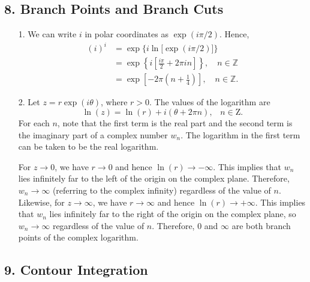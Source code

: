 \documentclass[10pt,a4paper]{article}
\begin{document}
\subsection*{8. Branch Points and Branch Cuts}

\begin{enumerate}
\item[1.]
We can write $i$ in polar coordinates as $\exp(i\pi/2).$ Hence,
\begin{align}
  (i)^i &= \exp\Big\{i \ln\big[\exp(i\pi/2)\big]\Big\} \\
  &= \exp\left\{i \left[\frac{i\pi}{2} + 2 \pi i n\right]\right\}, \quad n \in \mathbb{Z} \\
  &= \exp\left[- 2\pi\left(n+\frac{1}{4}\right) \right], \quad n \in \mathbb{Z}.
\end{align}

\item[2.]
Let $z = r\exp(i\theta)$, where $r > 0$. The values of the logarithm
are \begin{equation}
  \ln(z) = \ln(r) + i (\theta + 2\pi n), \;\;\;n \in \mathrm{Z}.
\end{equation}
For each $n$, note that the first term is the real part and the second
term is the imaginary part of a complex number $w_n$. The logarithm in
the first term can be taken to be the real logarithm.

For $z \rightarrow 0$, we have $r \rightarrow 0$ and hence
$\ln(r)\rightarrow -\infty$. This implies that $w_n$ lies infinitely
far to the left of the origin on the complex plane. Therefore, $w_n
\rightarrow \infty$ (referring to the complex infinity) regardless of
the value of $n$. Likewise, for $z \rightarrow \infty$, we have $r
\rightarrow \infty$ and hence $\ln(r)\rightarrow +\infty$. This
implies that $w_n$ lies infinitely far to the right of the origin on
the complex plane, so $w_n \rightarrow \infty$ regardless of the value
of $n$. Therefore, $0$ and $\infty$ are both branch points of the
complex logarithm.
\end{enumerate}

\subsection*{9. Contour Integration}
\end{document}
